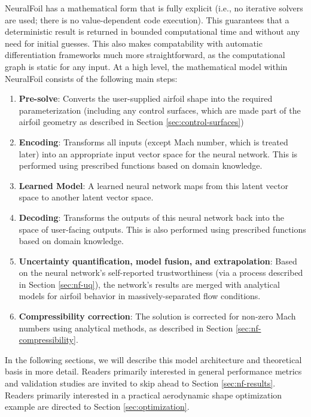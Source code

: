 \noindent NeuralFoil has a mathematical form that is fully explicit (i.e., no iterative solvers are used; there is no value-dependent code execution). This guarantees that a deterministic result is returned in bounded computational time and without any need for initial guesses. This also makes compatability with automatic differentiation frameworks much more straightforward, as the computational graph is static for any input. At a high level, the mathematical model within NeuralFoil consists of the following main steps:

\begin{enumerate}
    \item \textbf{Pre-solve}: Converts the user-supplied airfoil shape into the required parameterization (including any control surfaces, which are made part of the airfoil geometry as described in Section \ref{sec:control-surfaces})
    \item \textbf{Encoding}: Transforms all inputs (except Mach number, which is treated later) into an appropriate input vector space for the neural network. This is performed using prescribed functions based on domain knowledge.
    \item \textbf{Learned Model}: A learned neural network maps from this latent vector space to another latent vector space.
    \item \textbf{Decoding}: Transforms the outputs of this neural network back into the space of user-facing outputs. This is also performed using prescribed functions based on domain knowledge.
    \item \textbf{Uncertainty quantification, model fusion, and extrapolation}: Based on the neural network's self-reported trustworthiness (via a process described in Section \ref{sec:nf-uq}), the network's results are merged with analytical models for airfoil behavior in massively-separated flow conditions.
    \item \textbf{Compressibility correction}: The solution is corrected for non-zero Mach numbers using analytical methods, as described in Section \ref{sec:nf-compressibility}.
\end{enumerate}

In the following sections, we will describe this model architecture and theoretical basis in more detail. Readers primarily interested in general performance metrics and validation studies are invited to skip ahead to Section \ref{sec:nf-results}. Readers primarily interested in a practical aerodynamic shape optimization example are directed to Section \ref{sec:optimization}.

